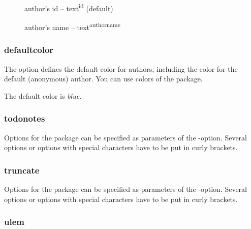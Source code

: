 \begin{description}
	\item [] author's id -- text\textsuperscript{id} (default)
	\item [] author's name -- text\textsuperscript{authorname}
\end{description}




\subsubsection{defaultcolor}


The  option defines the default color for authors, including the color for the default (anonymous) author.
You can use colors of the  package.

The default color is \emph{blue}.



\subsubsection{todonotes}


Options for the  package can be specified as parameters of the -option.
Several options or options with special characters have to be put in curly brackets.




\subsubsection{truncate}


Options for the  package can be specified as parameters of the -option.
Several options or options with special characters have to be put in curly brackets.



\subsubsection{ulem}

